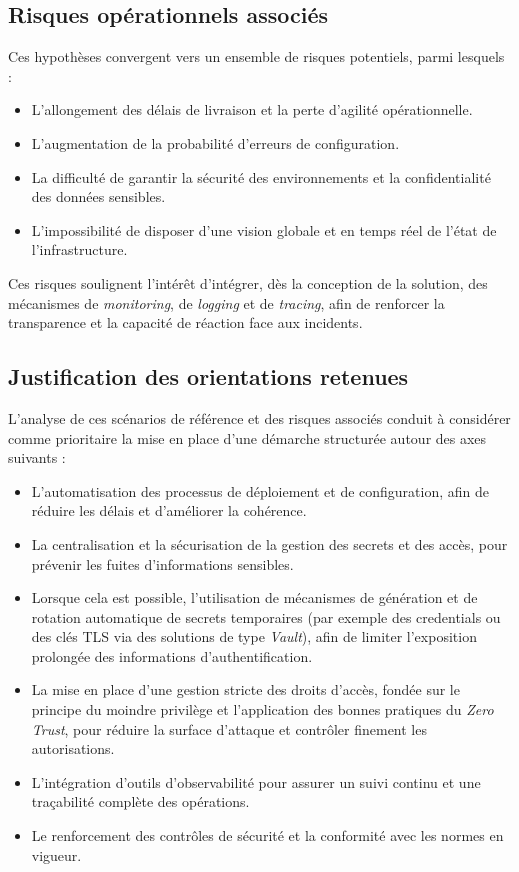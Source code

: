 \subsection{Risques opérationnels associés}

Ces hypothèses convergent vers un ensemble de risques potentiels, parmi lesquels :
\begin{itemize}
	\item L'allongement des délais de livraison et la perte d'agilité opérationnelle.
	\item L'augmentation de la probabilité d'erreurs de configuration.
	\item La difficulté de garantir la sécurité des environnements et la confidentialité des données sensibles.
	\item L'impossibilité de disposer d'une vision globale et en temps réel de l'état de l'infrastructure.
\end{itemize}

Ces risques soulignent l'intérêt d'intégrer, dès la conception de la solution, des mécanismes de \emph{monitoring}, de \emph{logging} et de \emph{tracing}, afin de renforcer la transparence et la capacité de réaction face aux incidents.

\subsection{Justification des orientations retenues}

L'analyse de ces scénarios de référence et des risques associés conduit à considérer comme prioritaire la mise en place d'une démarche structurée autour des axes suivants :
\begin{itemize}
	\item L'automatisation des processus de déploiement et de configuration, afin de réduire les délais et d'améliorer la cohérence.
	\item La centralisation et la sécurisation de la gestion des secrets et des accès, pour prévenir les fuites d'informations sensibles.
	\item Lorsque cela est possible, l'utilisation de mécanismes de génération et de rotation automatique de secrets temporaires (par exemple des credentials ou des clés TLS via des solutions de type \emph{Vault}), afin de limiter l'exposition prolongée des informations d'authentification.
	\item La mise en place d'une gestion stricte des droits d'accès, fondée sur le principe du moindre privilège et l'application des bonnes pratiques du \emph{Zero Trust}, pour réduire la surface d'attaque et contrôler finement les autorisations.
	\item L'intégration d'outils d'observabilité pour assurer un suivi continu et une traçabilité complète des opérations.
	\item Le renforcement des contrôles de sécurité et la conformité avec les normes en vigueur.
\end{itemize}

